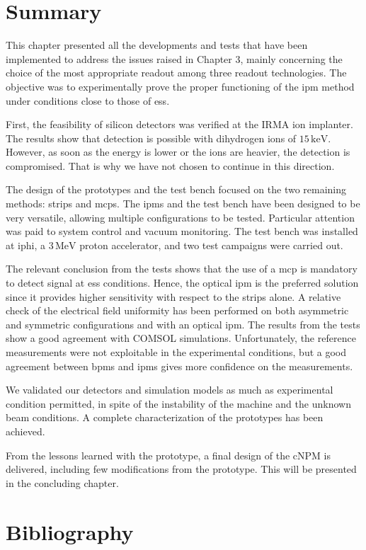 \begin{refsection}
  \section{Summary}
  \label{ch4:Summary}
  This chapter presented all the developments and tests that have been implemented to address the issues raised in Chapter 3, mainly concerning the choice of the most appropriate readout among three readout technologies. The objective was to experimentally prove the proper functioning of the \acrshort{ipm} method under conditions close to those of \acrshort{ess}.

  First, the feasibility of silicon detectors was verified at the IRMA ion implanter. The results show that detection is possible with dihydrogen ions of $15\,\mathrm{keV}$. However, as soon as the energy is lower or the ions are heavier, the detection is compromised. That is why we have not chosen to continue in this direction.

  The design of the prototypes and the test bench focused on the two remaining methods: strips and \acrshort{mcp}s. The \acrshort{ipm}s and the test bench have been designed to be very versatile, allowing multiple configurations to be tested. Particular attention was paid to system control and vacuum monitoring. The test bench was installed at \acrshort{iphi}, a $3\,\mathrm{MeV}$ proton accelerator, and two test campaigns were carried out.

  The relevant conclusion from the tests shows that the use of a \acrshort{mcp} is mandatory to detect signal at \acrshort{ess} conditions. Hence, the optical \acrshort{ipm} is the preferred solution since it provides higher sensitivity with respect to the strips alone. A relative check of the electrical field uniformity has been performed on both asymmetric and symmetric configurations and with an optical \acrshort{ipm}. The results from the tests show a good agreement with COMSOL simulations.
  Unfortunately, the reference measurements were not exploitable in the experimental conditions, but a good agreement between \acrshort{bpm}s and \acrshort{ipm}s gives more confidence on the measurements.

  We validated our detectors and simulation models as much as experimental condition permitted, in spite of the instability of the machine and the unknown beam conditions. A complete characterization of the prototypes has been achieved.

  From the lessons learned with the prototype, a final design of the cNPM is delivered, including few modifications from the prototype. This will be presented in the concluding chapter.

  \cleardoublepage
  \section{Bibliography}
  \label{ch4:bib}
  \printbibliography[heading=subbibliography]

\end{refsection}
